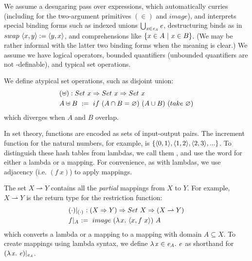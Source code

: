 \documentclass[preprint]{sigplanconf}
\newcommand{\restrict}[1]{\lvert_{#1}}
\newcommand{\pto}{\rightharpoonup}
\begin{document}
We assume a desugaring pass over \lzfclang expressions, which automatically curries (including for the two-argument primitives $(\in)$ and $image$), and interprets special binding forms such as indexed unions $\textstyle\bigcup_{\mathit{x} \in \mathit{e_A}}\mathit{e}$, destructuring binds as in $swap~\langle{x,y}\rangle := \langle{y,x}\rangle$, and comprehensions like $\lbrace {x \in A} \ \lvert\ {x \in B} \rbrace$.
(We may be rather informal with the latter two binding forms when the meaning is clear.)
We assume we have logical operators, bounded quantifiers (unbounded quantifiers are not \lzfclang-definable), and typical set operations.

We define atypical set operations, such as disjoint union:
\begin{equation}
\begin{aligned}
	&(\uplus) : Set~x \Rightarrow Set~x \Rightarrow Set~x \\
	&A \uplus B \ := \ if~(A \cap B = \varnothing)~(A \cup B)~(take~\varnothing)
\end{aligned}
\end{equation}
which diverges when $A$ and $B$ overlap.

In set theory, functions are encoded as sets of input-output pairs.
The increment function for the natural numbers, for example, is $\{{\langle{0,1}\rangle,\langle{1,2}\rangle,\langle{2,3}\rangle,...}\}$.
To distinguish these hash tables from lambdas, we call them , and use the word  for either a lambda or a mapping.
For convenience, as with lambdas, we use adjacency (i.e. $(f~x)$) to apply mappings.

The set $X \pto Y$ contains all the \emph{partial} mappings from $X$ to $Y$.
For example, $X \pto Y$ is the return type for the restriction function:
\begin{equation}
\begin{aligned}
	&(\cdot)\restrict{(\cdot)}\ : (X \tto Y) \tto Set~X \tto (X \pto Y) \\
	&f\restrict{A} \ := \ image~(\fun{x}{\pair{x, f~x}})~A
\end{aligned}
\end{equation}
which converts a lambda or a mapping to a mapping with domain $A \subseteq X$.
To create mappings using lambda syntax, we define $\lambda\mspace{2mu}{\mathit{x} \in \mathit{e_A}}\ldotp\,{\mathit{e}}$ as shorthand for $(\fun{\mathit{x}}{\mathit{e}})\restrict{\mathit{e_A}}$.
\end{document}
